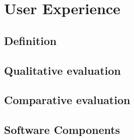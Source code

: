 \section{User Experience}


\subsection{Definition}

\subsection{Qualitative evaluation}

\subsection{Comparative evaluation}

\subsection{Software Components}